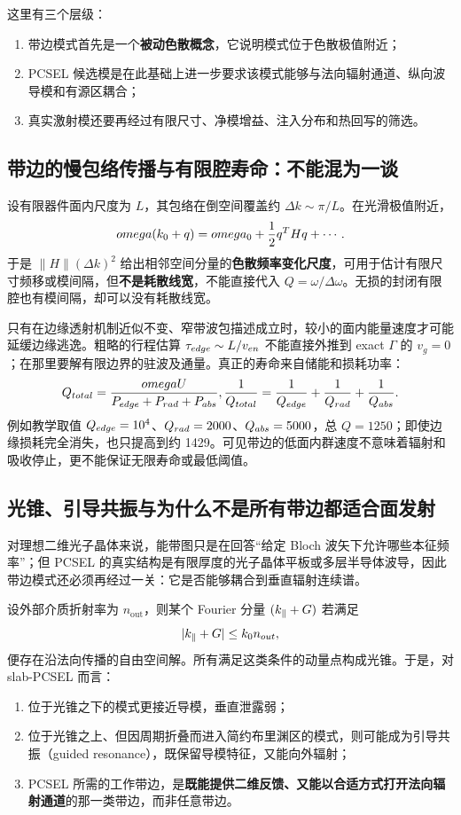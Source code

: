 这里有三个层级：
\begin{enumerate}
  \item 带边模式首先是一个\textbf{被动色散概念}，它说明模式位于色散极值附近；
  \item PCSEL 候选模是在此基础上进一步要求该模式能够与法向辐射通道、纵向波导模和有源区耦合；
  \item 真实激射模还要再经过有限尺寸、净模增益、注入分布和热回写的筛选。
\end{enumerate}

\subsection{带边的慢包络传播与有限腔寿命：不能混为一谈}
设有限器件面内尺度为 $L$，其包络在倒空间覆盖约 $\Delta k\sim\pi/L$。在光滑极值附近，
\[
omega(k_0+q)=omega_0+\frac12q^{T}Hq+\cdots.
\]
于是 $\|H\|(\Delta k)^2$ 给出相邻空间分量的\textbf{色散频率变化尺度}，可用于估计有限尺寸频移或模间隔，但\textbf{不是耗散线宽}，不能直接代入 $Q=\omega/\Delta\omega$。无损的封闭有限腔也有模间隔，却可以没有耗散线宽。

只有在边缘透射机制近似不变、窄带波包描述成立时，较小的面内能量速度才可能延缓边缘逃逸。粗略的行程估算 $\tau_{\rm edge}\sim L/v_{\rm en}$ 不能直接外推到 exact $\Gamma$ 的 $v_g=0$；在那里要解有限边界的驻波及通量。真正的寿命来自储能和损耗功率：
\[
Q_{\rm total}=\frac{\omega U}{P_{\rm edge}+P_{\rm rad}+P_{\rm abs}},
\qquad
\frac1{Q_{\rm total}}=\frac1{Q_{\rm edge}}+\frac1{Q_{\rm rad}}+\frac1{Q_{\rm abs}}.
\]
例如教学取值 $Q_{\rm edge}=10^4$、$Q_{\rm rad}=2000$、$Q_{\rm abs}=5000$，总 $Q=1250$；即使边缘损耗完全消失，也只提高到约 1429。可见带边的低面内群速度不意味着辐射和吸收停止，更不能保证无限寿命或最低阈值。

\subsection{光锥、引导共振与为什么不是所有带边都适合面发射}

对理想二维光子晶体来说，能带图只是在回答“给定 Bloch 波矢下允许哪些本征频率”；但 PCSEL 的真实结构是有限厚度的光子晶体平板或多层半导体波导，因此带边模式还必须再经过一关：它是否能够耦合到垂直辐射连续谱。

设外部介质折射率为 $n_{\mathrm{out}}$，则某个 Fourier 分量 $(k_{\parallel}+G)$ 若满足
\begin{equation}
  |k_{\parallel}+G| \le k_0 n_{out},
\label{eq:light_cone_band_ch5}
\end{equation}
便存在沿法向传播的自由空间解。所有满足这类条件的动量点构成光锥。于是，对 slab-PCSEL 而言：
\begin{enumerate}
  \item 位于光锥之下的模式更接近导模，垂直泄露弱；
  \item 位于光锥之上、但因周期折叠而进入简约布里渊区的模式，则可能成为引导共振（guided resonance），既保留导模特征，又能向外辐射；
  \item PCSEL 所需的工作带边，是\textbf{既能提供二维反馈、又能以合适方式打开法向辐射通道}的那一类带边，而非任意带边。
\end{enumerate}

